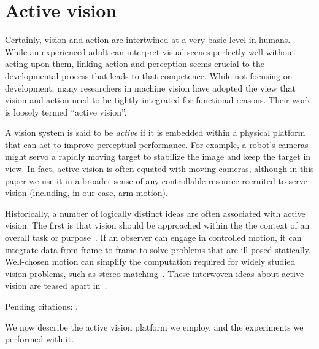 \section{Active vision}

Certainly, vision and action are intertwined at a very basic level in
humans.  While an experienced adult can interpret visual scenes
perfectly well without acting upon them, linking action and perception
seems crucial to the developmental process that leads to that
competence.  While not focusing on development, many researchers in
machine vision have adopted the view that vision and action need to be
tightly integrated for functional reasons.  Their work is loosely
termed ``active vision''.

A vision system is said to be {\em active} if it is embedded within a
physical platform that can act to improve perceptual performance.  For
example, a robot's cameras might servo a rapidly moving target to
stabilize the image and keep the target in view.  In fact, active
vision is often equated with moving cameras, although in this paper we
use it in a broader sense of any controllable resource recruited to
serve vision (including, in our case, arm motion).

Historically, a number of logically distinct ideas are often
associated with active vision.  The first is that vision should be
approached within the the context of an overall task or
purpose~\cite{aloimonos87active}.  If an observer can engage in
controlled motion, it can integrate data from frame to frame to solve
problems that are ill-posed statically.  Well-chosen motion can
simplify the computation required for widely studied vision problems,
such as stereo matching~\cite{bajcsy88active,ballard91animate}.  These
interwoven ideas about active vision are teased apart
in~\cite{tarr94computational}.

Pending citations: \cite{tsikos91segmentation}.

We now describe the active vision platform we employ, and the 
experiments we performed with it.

